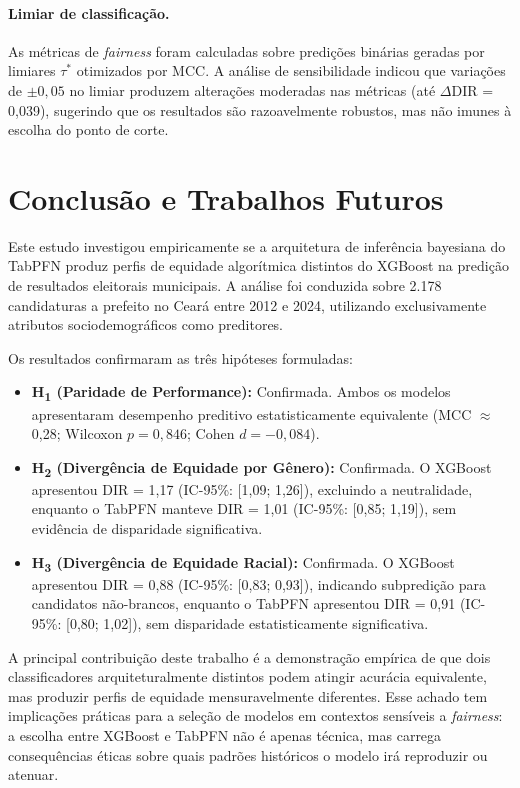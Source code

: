 \documentclass[12pt]{article}
\begin{document}
\paragraph{Limiar de classificação.} As métricas de \textit{fairness} foram calculadas sobre predições binárias geradas por limiares $\tau^*$ otimizados por MCC. A análise de sensibilidade indicou que variações de $\pm 0{,}05$ no limiar produzem alterações moderadas nas métricas (até $\Delta$DIR = 0,039), sugerindo que os resultados são razoavelmente robustos, mas não imunes à escolha do ponto de corte.

\section{Conclusão e Trabalhos Futuros}

Este estudo investigou empiricamente se a arquitetura de inferência bayesiana do TabPFN produz perfis de equidade algorítmica distintos do XGBoost na predição de resultados eleitorais municipais. A análise foi conduzida sobre 2.178 candidaturas a prefeito no Ceará entre 2012 e 2024, utilizando exclusivamente atributos sociodemográficos como preditores.

Os resultados confirmaram as três hipóteses formuladas:

\begin{itemize}
  \item \textbf{H\textsubscript{1} (Paridade de Performance):} Confirmada. Ambos os modelos apresentaram desempenho preditivo estatisticamente equivalente (MCC $\approx$ 0,28; Wilcoxon $p = 0{,}846$; Cohen $d = -0{,}084$).

  \item \textbf{H\textsubscript{2} (Divergência de Equidade por Gênero):} Confirmada. O XGBoost apresentou DIR = 1,17 (IC-95\%: [1,09; 1,26]), excluindo a neutralidade, enquanto o TabPFN manteve DIR = 1,01 (IC-95\%: [0,85; 1,19]), sem evidência de disparidade significativa.

  \item \textbf{H\textsubscript{3} (Divergência de Equidade Racial):} Confirmada. O XGBoost apresentou DIR = 0,88 (IC-95\%: [0,83; 0,93]), indicando subpredição para candidatos não-brancos, enquanto o TabPFN apresentou DIR = 0,91 (IC-95\%: [0,80; 1,02]), sem disparidade estatisticamente significativa.
\end{itemize}

A principal contribuição deste trabalho é a demonstração empírica de que dois classificadores arquiteturalmente distintos podem atingir acurácia equivalente, mas produzir perfis de equidade mensuravelmente diferentes. Esse achado tem implicações práticas para a seleção de modelos em contextos sensíveis a \textit{fairness}: a escolha entre XGBoost e TabPFN não é apenas técnica, mas carrega consequências éticas sobre quais padrões históricos o modelo irá reproduzir ou atenuar.
\end{document}
